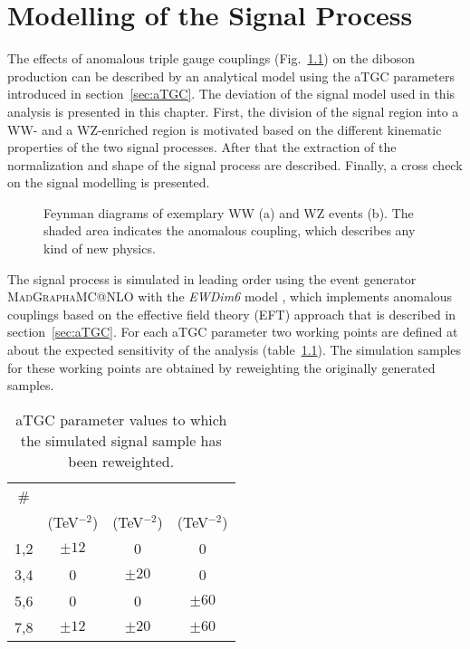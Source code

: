 \chapter{Modelling of the Signal Process}
\label{chap:signal}
The effects of anomalous triple gauge couplings (Fig.~\ref{fig:signal:fy_atgc}) on the diboson production can be described by an analytical model using the aTGC parameters introduced in section~\ref{sec:aTGC}. The deviation of the signal model used in this analysis is presented in this chapter. First, the division of the signal region into a WW- and a WZ-enriched region is motivated based on the different kinematic properties of the two signal processes. After that the extraction of the normalization and shape of the signal process are described. Finally, a cross check on the signal modelling is presented.\\
\begin{figure}
	\centering
	\caption[Feynman diagrams of two exemplary signal events]{Feynman diagrams of exemplary WW (a) and WZ events (b). The shaded area indicates the anomalous coupling, which describes any kind of new physics.}
	\label{fig:signal:fy_atgc}
\end{figure}

\noindent The signal process is simulated in leading order using the event generator \textsc{MadGraph\textunderscore aMC@NLO} with the \textit{EWDim6} model \cite{EFT}, which implements anomalous couplings based on the effective field theory (EFT) approach that is described in section~\ref{sec:aTGC}. For each aTGC parameter two working points are defined at about the expected sensitivity of the analysis (table~\ref{tab:signal:aTGCpoints}). The simulation samples for these working points are obtained by reweighting the originally generated samples.
\begin{table}
	\centering
	\caption[aTGC working points]{aTGC parameter values to which the simulated signal sample has been reweighted.}
	\label{tab:signal:aTGCpoints}
	\begin{tabular}{cccc}
	\hline
	\# & \Tcwww & \Tccw & \Tcb \\
	\ & (TeV$^{-2}$) & (TeV$^{-2}$) & (TeV$^{-2}$)\\
	\hline
	1,2 &  $\pm 12$ & 0 & 0\\
	3,4 & 0 &  $\pm 20$ & 0\\
	5,6 & 0 & 0 &  $\pm 60$\\
	7,8 &	$\pm 12$ & $\pm 20$ & $\pm 60$\\
	\hline
	\end{tabular}
\end{table}

